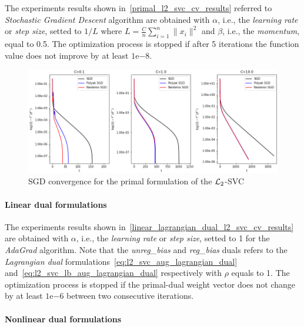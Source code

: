 The experiments results shown in~\ref{primal_l2_svc_cv_results} referred to \emph{Stochastic Gradient Descent} algorithm are obtained with $\alpha$, i.e., the \emph{learning rate} or \emph{step size}, setted to $1/L$ where $\displaystyle L = \frac{C}{n} \sum_{i=1}^n \| x_i \|^2$ and $\beta$, i.e., the \emph{momentum}, equal to 0.5. The optimization process is stopped if after 5 iterations the function value does not improve by at least $1\mathrm{e}{-8}$.



\begin{figure}[H]
	\centering
	\includegraphics[scale=0.55]{img/l2_svc_loss_history}
	\caption{SGD convergence for the primal formulation of the $\protect \mathcal{L}_2$-SVC}
	\label{fig:l2_svc_loss_history}
\end{figure}

\pagebreak

\paragraph{Linear dual formulations}

The experiments results shown in~\ref{linear_lagrangian_dual_l2_svc_cv_results} are obtained with $\alpha$, i.e., the \emph{learning rate} or \emph{step size}, setted to 1 for the \emph{AdaGrad} algorithm. Note that the \emph{unreg\_bias} and \emph{reg\_bias} duals refers to the \emph{Lagrangian dual} formulations~\eqref{eq:l2_svc_aug_lagrangian_dual} and~\eqref{eq:l2_svc_lb_aug_lagrangian_dual} respectively with $\rho$ equals to 1. The optimization process is stopped if the primal-dual weight vector does not change by at least $1\mathrm{e}{-6}$  between two consecutive iterations.



\paragraph{Nonlinear dual formulations}


